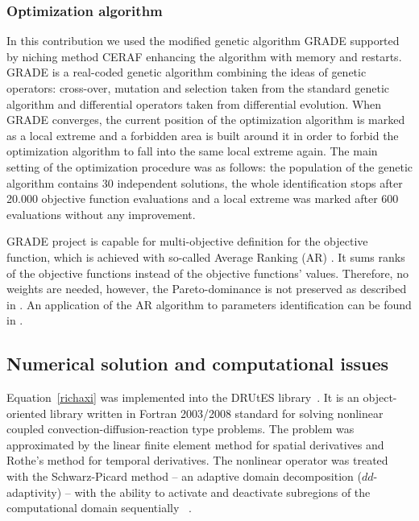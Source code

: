 \documentclass[review,times,3p,10pt]{elsarticle}
\begin{document}
\subsubsection{Optimization algorithm}%
\label{optima}

In this contribution we used the modified genetic algorithm GRADE \citep{grade,Kucerova:2007:PHD} supported by niching method CERAF \citep{Hrstka} enhancing the algorithm with
memory and restarts. GRADE is a real-coded genetic algorithm combining the ideas of genetic operators: cross-over, mutation and selection taken from the standard genetic algorithm and differential operators taken from differential evolution. When GRADE converges, the current position of the optimization algorithm is marked as a local extreme and a forbidden area is built around it in order to forbid the optimization algorithm to fall into the same local extreme again. The main setting of the optimization procedure was as follows: the population of the genetic algorithm contains 30 independent solutions, the whole identification stops after 20.000 objective function evaluations and a local extreme was marked after 600 evaluations without any improvement.

GRADE project is capable for multi-objective definition for the objective function, which is achieved with so-called
 Average Ranking (AR) \citep{Leps2007}. It sums ranks of the objective functions instead of the objective functions' values. Therefore, no weights are needed, however, the Pareto-dominance is not preserved as described in \cite{vitingerova:2010}. An application of the AR algorithm to parameters identification can be found in \cite{Kuraz:2010:JCAM}. 


\subsection{Numerical solution and computational issues}
\label{trapoty}

Equation~\eqref{richaxi} was implemented into the DRUtES library~\citep{drutes}. It is an object-oriented library written in Fortran 2003/2008 standard for solving nonlinear coupled convection-diffusion-reaction type problems. The problem was approximated by the linear finite element method for spatial derivatives and Rothe's method for temporal derivatives. The nonlinear operator was treated with the Schwarz-Picard method -- an adaptive domain decomposition  ($dd$-adaptivity) -- with the ability to activate and deactivate subregions of the computational domain sequentially ~\citep{mojecomp, mojejcam2, mojeamc2}.
\end{document}
